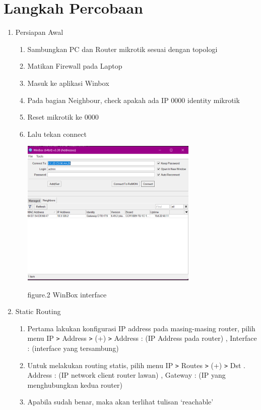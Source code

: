 \section{Langkah Percobaan}
\begin{enumerate}
    \item Persiapan Awal
    
    \begin{enumerate}
        \item Sambungkan PC dan Router mikrotik sesuai dengan topologi
        \item Matikan Firewall pada Laptop
        \item Masuk ke aplikasi Winbox
        \item Pada bagian Neighbour, check apakah ada IP 0000 identity mikrotik
        \item Reset mikrotik ke 0000
        \item Lalu tekan connect
        
        \begin{center}
            \includegraphics[width=0.7\textwidth]{image/Winbox-interface.png}    
            
            figure.2 WinBox interface
        \end{center}

    \end{enumerate}

    \item Static Routing 
    
    \begin{enumerate}
        \item Pertama lakukan konfigurasi IP address pada masing-masing router, pilih menu IP \texttt{\text>} Address \texttt{\text>} (+) \texttt{\text>} Address : (IP Address pada router) , Interface : (interface yang tersambung)
        \item Untuk melakukan routing statis, pilih menu IP \texttt{\text>} Routes \texttt{\text>} (+) \texttt{\text>} Dst . Address : (IP network client router lawan) , Gateway : (IP yang menghubungkan kedua router)
        \item Apabila sudah benar, maka akan terlihat tulisan ‘reachable’
        

\end{enumerate}
\end{enumerate}
